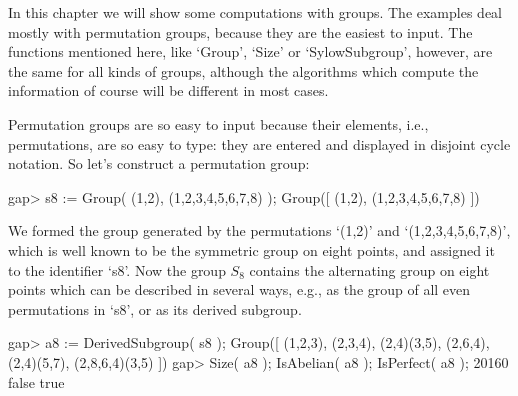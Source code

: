 


In this chapter we will show  some computations with groups. The examples
deal mostly with permutation groups, because they are the easiest 
to input.  The functions mentioned here, like `Group', `Size' or
`SylowSubgroup', however, are the same for all  kinds of groups, although
the algorithms which compute the information  of course will be different
in most cases.


Permutation  groups  are so easy to  input  because their elements, i.e.,
permutations,  are  so easy to  type: they  are  entered and displayed in
disjoint cycle notation. So let's construct a permutation group:

\beginexample
gap> s8 := Group( (1,2), (1,2,3,4,5,6,7,8) );
Group([ (1,2), (1,2,3,4,5,6,7,8) ])
\endexample

We formed the group generated by the permutations `(1,2)' and
`(1,2,3,4,5,6,7,8)', which is well known to be the symmetric group on
eight points, and assigned it to the identifier `s8'.  Now the group
$S_8$ contains the alternating group on eight points which can be
described in several ways, e.g., as the group of all even permutations
in `s8', or as its derived subgroup.

\beginexample
gap> a8 := DerivedSubgroup( s8 );
Group([ (1,2,3), (2,3,4), (2,4)(3,5), (2,6,4), (2,4)(5,7), (2,8,6,4)(3,5) ])
gap> Size( a8 ); IsAbelian( a8 ); IsPerfect( a8 );
20160
false
true
\endexample

